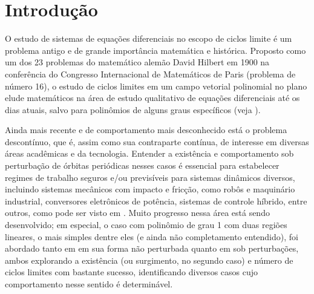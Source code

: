 \clearpage

\tableofcontents

\clearpage

\section{Introdução}
O estudo de sistemas de equações diferenciais no escopo de ciclos limite é um problema antigo e de grande importância matemática e histórica. Proposto como um dos 23 problemas do matemático alemão David Hilbert em 1900 na conferência do Congresso Internacional de Matemáticos de Paris (problema de número 16), o estudo de ciclos limites em um campo vetorial polinomial no plano elude matemáticos na área de estudo qualitativo de equações diferenciais até os dias atuais, salvo para polinômios de alguns graus específicos  (veja \cite{JLi}). 

Ainda mais recente e de comportamento mais desconhecido está o problema descontínuo, que é, assim como sua contraparte contínua, de interesse em diversas áreas acadêmicas e da tecnologia. Entender a existência e comportamento sob perturbação de órbitas periódicas nesses casos é essencial para estabelecer regimes de trabalho seguros e/ou previsíveis para sistemas dinâmicos diversos, incluindo sistemas mecânicos com impacto e fricção, como robôs e maquinário industrial, conversores eletrônicos de potência, sistemas de controle híbrido, entre outros, como pode ser visto em \cite{bernardoetal}. Muito progresso nessa área está sendo desenvolvido; em especial, o caso com polinômio de grau 1 com duas regiões lineares, o mais simples dentre eles (e ainda não completamento entendido), foi abordado tanto em \cite{Huan:etal:2012} em sua forma não perturbada quanto em \cite{HAN20102399} sob perturbações, ambos explorando a existência (ou surgimento, no segundo caso) e número de ciclos limites com bastante sucesso, identificando diversos casos cujo comportamento nesse sentido é determinável.

